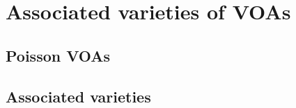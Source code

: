 \section{Associated varieties of VOAs}
    \subsection{Poisson VOAs}
        \begin{definition} \label{def: poisson_VOAs}
            
        \end{definition}

    \subsection{Associated varieties}